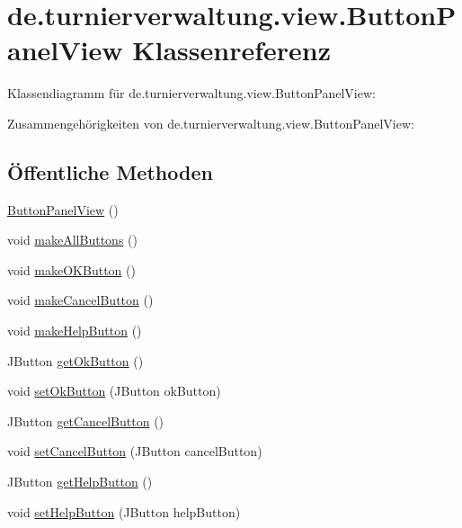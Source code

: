 \hypertarget{classde_1_1turnierverwaltung_1_1view_1_1_button_panel_view}{}\section{de.\+turnierverwaltung.\+view.\+Button\+Panel\+View Klassenreferenz}
\label{classde_1_1turnierverwaltung_1_1view_1_1_button_panel_view}


Klassendiagramm für de.\+turnierverwaltung.\+view.\+Button\+Panel\+View\+:


Zusammengehörigkeiten von de.\+turnierverwaltung.\+view.\+Button\+Panel\+View\+:
\subsection*{Öffentliche Methoden}
\begin{DoxyCompactItemize}
\item 
\hyperlink{classde_1_1turnierverwaltung_1_1view_1_1_button_panel_view_adcd6721bd8ffe965896f05094dd72371}{Button\+Panel\+View} ()
\item 
void \hyperlink{classde_1_1turnierverwaltung_1_1view_1_1_button_panel_view_a786c9d23277354f9da73506c2206450a}{make\+All\+Buttons} ()
\item 
void \hyperlink{classde_1_1turnierverwaltung_1_1view_1_1_button_panel_view_a3f71387f9422c4afc08c0391ffa91e0a}{make\+O\+K\+Button} ()
\item 
void \hyperlink{classde_1_1turnierverwaltung_1_1view_1_1_button_panel_view_a66056d5bc26a2f06b8b1e8d7d0c41ec6}{make\+Cancel\+Button} ()
\item 
void \hyperlink{classde_1_1turnierverwaltung_1_1view_1_1_button_panel_view_af59aa84334fc7d384561092a52b9c03a}{make\+Help\+Button} ()
\item 
J\+Button \hyperlink{classde_1_1turnierverwaltung_1_1view_1_1_button_panel_view_af734a34d3850119c636b0254ce2902ee}{get\+Ok\+Button} ()
\item 
void \hyperlink{classde_1_1turnierverwaltung_1_1view_1_1_button_panel_view_ade8831a88f11cf4483c524623a6d4616}{set\+Ok\+Button} (J\+Button ok\+Button)
\item 
J\+Button \hyperlink{classde_1_1turnierverwaltung_1_1view_1_1_button_panel_view_a2866caa746fccbc4dcdc96edb834b3b5}{get\+Cancel\+Button} ()
\item 
void \hyperlink{classde_1_1turnierverwaltung_1_1view_1_1_button_panel_view_a4670f0ff0b5d8173ab050dded909016c}{set\+Cancel\+Button} (J\+Button cancel\+Button)
\item 
J\+Button \hyperlink{classde_1_1turnierverwaltung_1_1view_1_1_button_panel_view_a0b72e74e97314043aa25da7e309a9a0d}{get\+Help\+Button} ()
\item 
void \hyperlink{classde_1_1turnierverwaltung_1_1view_1_1_button_panel_view_a50662d6da65fa3ea1e5cab9fbd048f9b}{set\+Help\+Button} (J\+Button help\+Button)
\end{DoxyCompactItemize}


